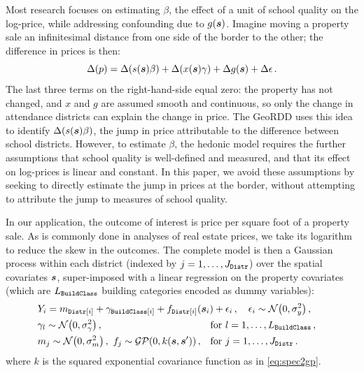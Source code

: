 Most research focuses on estimating $\beta$, the effect of a unit of school quality on the log-price, while addressing confounding due to $g(\bm{s})$.
Imagine moving a property sale an infinitesimal distance from one side of the border to the other; 
the difference in prices is then:
\begin{equation}
    \Delta(p) = \Delta(s(\bm{s}) \beta) + \Delta(x(\bm{s})\gamma)+ \Delta{g(\bm{s})} + \Delta{\epsilon}
    \,.
    \label{eq:hedonic_diff}
\end{equation}
The last three terms on the right-hand-side equal zero: the property has not changed, and $x$ and $g$ are assumed smooth and continuous, so only the change in attendance districts can explain the change in price.
The GeoRDD uses this idea to identify $\Delta(s(\bm{s}) \beta)$, the jump in price attributable to the difference between school districts.
However, to estimate $\beta$, the hedonic model requires the further assumptions that school quality is well-defined and measured, and that its effect on log-prices is linear and constant.
In this paper, we avoid these assumptions by seeking to directly estimate the jump in prices at the border, without attempting to attribute the jump to measures of school quality.

In our application, the outcome of interest is price per square foot of a property sale.
As is commonly done in analyses of real estate prices, we take its logarithm to reduce the skew in the outcomes.
The complete model is then a Gaussian process within each district (indexed by \(j=1,\dotsc,J_{\mathtt{Distr}}\)) over the spatial covariates \(\bm{s}\), super-imposed with a linear regression on the property covariates (which are \(L_{\mathtt{BuildClass}}\) building categories encoded as dummy variables):
\begin{equation}
    \begin{aligned}
        & Y_i = %
            m_{\district\sbr{i}} + \gamma_{\building\sbr{i}}
            + f_{\district\sbr{i}}(\svec_i) + \epsilon_i 
            \,,\quad
             \epsilon_i \sim \normal\del{0, \sigma_y^2} 
            \,,
            \phantom{\hspace{-10cm}} %
            \\
        & \gamma_{l} \sim \normal\del{0, \sigma_\gamma^2}
            \,,
            &&
            \text{for }
            l=1,\dotsc,L_\building \,, \\
        & m_{j} \sim \normal\del{0, \sigmamu^2}
        \,,\ 
        f_j \sim \GP\del{0, k(\svec, \svec')}
            \,,
            &&
            \text{for }
            j=1,\dotsc,J_\district
        \,.
    \end{aligned}
    \label{eq:nyc_model}
\end{equation}
where \(k\) is the squared exponential covariance function as in \autoref{eq:spec2gp}.


